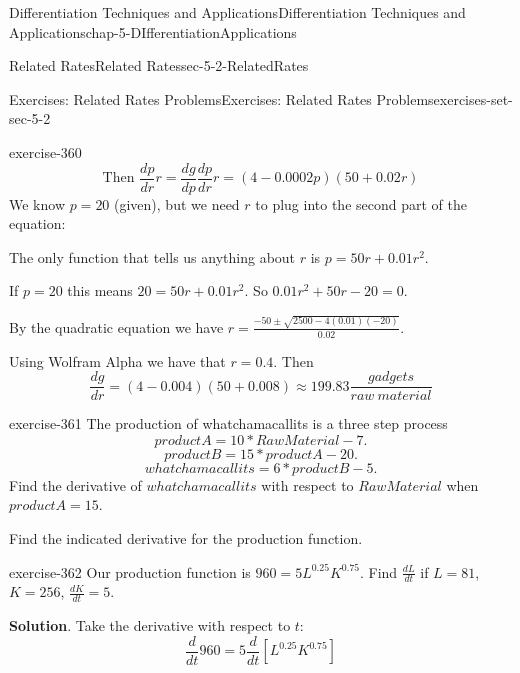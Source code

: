 \documentclass[oneside,10pt,]{book}
\numberwithin{equation}{section}
\begin{document}
\begin{chapterptx}{Differentiation Techniques and Applications}{}{Differentiation Techniques and Applications}{}{}{chap-5-DIfferentiationApplications}
\begin{sectionptx}{Related Rates}{}{Related Rates}{}{}{sec-5-2-RelatedRates}
\begin{exercises-subsection-numberless}{Exercises: Related Rates Problems}{}{Exercises: Related Rates Problems}{}{}{exercises-set-sec-5-2}
\begin{divisionexercise}{15}{}{}{exercise-360}
%
\begin{equation*}
\text{Then }\frac{dp}{dr}r=\frac{dg}{dp}  \frac{dp}{dr}r=(4 -0.0002 p)  (50+0.02 r)
\end{equation*}
\hypertarget{p-2006}{}%
We know \(p = 20\) (given), but we need \(r\) to plug into the second part of the equation:%
\par
\hypertarget{p-2007}{}%
The only function that tells us anything about \(r\) is \(p=50r+0.01 r^2\).%
\par
\hypertarget{p-2008}{}%
If \(p = 20\) this means \(20=50r+0.01 r^2\).  So \(0.01 r^2+50r-20=0\).%
\par
\hypertarget{p-2009}{}%
By the quadratic equation we have \(r=  \frac{-50\pm \sqrt{2500-4(0.01)(-20)}}{0.02}\).%
\par
\hypertarget{p-2010}{}%
Using Wolfram Alpha we have that \(r = 0.4\). Then%
%
\begin{equation*}
\frac{dg}{dr}=(4 -0.004 )  (50+0.008 )\approx 199.83 
\frac{gadgets}{raw\ material}
\end{equation*}
\end{divisionexercise}%
\begin{divisionexercise}{16}{}{}{exercise-361}%
\hypertarget{p-2011}{}%
The production of whatchamacallits is a three step process%
%
\begin{equation*}
productA=10*RawMaterial-7.
\end{equation*}
%
\begin{equation*}
productB=15*productA-20.
\end{equation*}
%
\begin{equation*}
whatchamacallits=6*productB-5.
\end{equation*}
\hypertarget{p-2012}{}%
Find the derivative of \(whatchamacallits\) with respect to \(RawMaterial\) when \(productA =15\).%
\end{divisionexercise}%
\hypertarget{p-2013}{}%
Find the indicated derivative for the production function.%
\begin{divisionexercise}{17}{}{}{exercise-362}%
\hypertarget{p-2014}{}%
Our production function is \(960=5L^{0.25} K^{0.75}\).  Find \(\frac{dL}{dt}\) if \(L=81\), \(K=256\),  \(\frac{dK}{dt}=5\).%
\par\smallskip%
\noindent\textbf{Solution}.\hypertarget{solution-182}{}\quad%
\hypertarget{p-2015}{}%
Take the derivative with respect to \(t\):%
%
\begin{equation*}
\frac{d}{dt} 960=5 \frac{d}{dt}[L^{0.25} K^{0.75}]
\end{equation*}

\end{divisionexercise}
\end{exercises-subsection-numberless}
\end{sectionptx}
\end{chapterptx}
\end{document}
